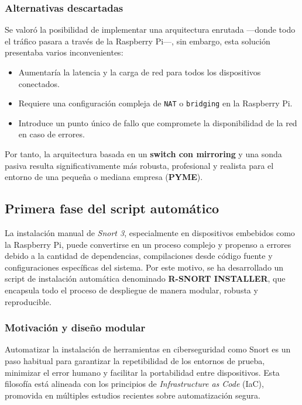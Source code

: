 \documentclass[11pt,a4paper,twoside]{report}
\begin{document}
\subsubsection{Alternativas descartadas}

Se valoró la posibilidad de implementar una arquitectura enrutada —donde todo el tráfico pasara a través de la Raspberry Pi—, sin embargo, esta solución presentaba varios inconvenientes:

\begin{itemize}
	\item Aumentaría la latencia y la carga de red para todos los dispositivos conectados.
	\item Requiere una configuración compleja de \texttt{NAT} o \texttt{bridging} en la Raspberry Pi.
	\item Introduce un punto único de fallo que compromete la disponibilidad de la red en caso de errores.
\end{itemize}

Por tanto, la arquitectura basada en un \textbf{switch con mirroring} y una sonda pasiva resulta significativamente más robusta, profesional y realista para el entorno de una pequeña o mediana empresa (\textbf{PYME}).


\subsection{Primera fase del script automático}
La instalación manual de \textit{Snort 3}, especialmente en dispositivos embebidos como la Raspberry Pi, puede convertirse en un proceso complejo y propenso a errores debido a la cantidad de dependencias, compilaciones desde código fuente y configuraciones específicas del sistema. Por este motivo, se ha desarrollado un script de instalación automática denominado \textbf{R-SNORT INSTALLER}, que encapsula todo el proceso de despliegue de manera modular, robusta y reproducible.

\subsubsection{Motivación y diseño modular}

Automatizar la instalación de herramientas en ciberseguridad como Snort es un paso habitual para garantizar la repetibilidad de los entornos de prueba, minimizar el error humano y facilitar la portabilidad entre dispositivos. Esta filosofía está alineada con los principios de \textit{Infrastructure as Code} (IaC), promovida en múltiples estudios recientes sobre automatización segura.
\newline
\end{document}
